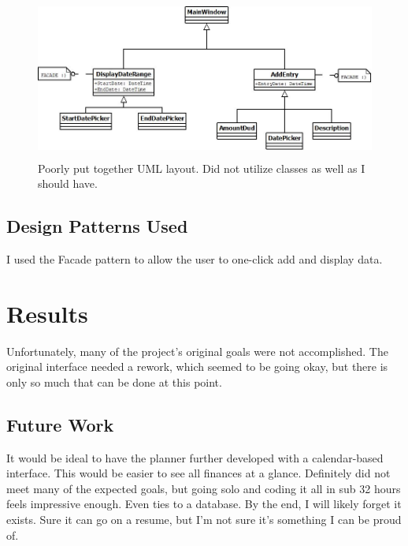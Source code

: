 \documentclass[10pt,conference,onecolumn,compsoc]{IEEEtran}
\begin{document}
\begin{figure}[ht!]
\includegraphics[height=200px, width=500px]{FinancialDMDiagram.jpg}
\caption{Poorly put together UML layout. Did not utilize classes as well as I should have.}
\label{UML}
\end{figure}


\subsection{Design Patterns Used}
I used the Facade pattern to allow the user to one-click add and display data.

\section{Results}
Unfortunately, many of the project's original goals were not accomplished. The original interface needed a rework, which seemed to be going okay, but there is only so much that can be done at this point.

\subsection{Future Work}
It would be ideal to have the planner further developed with a calendar-based interface. This would be easier to see all finances at a glance.
Definitely did not meet many of the expected goals, but going solo and coding it all in sub 32 hours feels impressive enough. Even ties to a database.
By the end, I will likely forget it exists. Sure it can go on a resume, but I'm not sure it's something I can be proud of.

\end{document}
